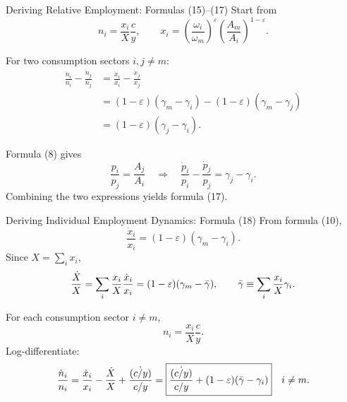 \begin{frame}[label=appendixrelative]{Deriving Relative Employment: Formulas (15)--(17)}
  \scriptsize
  Start from
  \[
    n_i=\frac{x_i}{X}\frac{c}{y},\qquad
    x_i=\left(\frac{\omega_i}{\omega_m}\right)^\varepsilon
      \left(\frac{A_m}{A_i}\right)^{1-\varepsilon}.
  \]

  For two consumption sectors $i,j\neq m$:
  \begin{align*}
    \frac{\dot n_i}{n_i}-\frac{\dot n_j}{n_j}
      &=\frac{\dot x_i}{x_i}-\frac{\dot x_j}{x_j}\\
      &=(1-\varepsilon)(\gamma_m-\gamma_i)
        -(1-\varepsilon)(\gamma_m-\gamma_j)\\
      &=(1-\varepsilon)(\gamma_j-\gamma_i).
  \end{align*}

  Formula (8) gives
  \[
    \frac{p_i}{p_j}
    =
    \frac{A_j}{A_i}
    \quad\Longrightarrow\quad
    \frac{\dot p_i}{p_i}-\frac{\dot p_j}{p_j}
    =
    \gamma_j-\gamma_i .
  \]
  Combining the two expressions yields formula (17).

  \hyperlink{relativeemployment}{}
\end{frame}

\begin{frame}[label=appendixindividual]{Deriving Individual Employment Dynamics: Formula (18)}
  \scriptsize
  From formula (10),
  \[
    \frac{\dot x_i}{x_i}
    =
    (1-\varepsilon)(\gamma_m-\gamma_i).
  \]
  Since $X=\sum_i x_i$,
  \[
    \frac{\dot X}{X}
    =
    \sum_i\frac{x_i}{X}\frac{\dot x_i}{x_i}
    =
    (1-\varepsilon)(\gamma_m-\bar{\gamma}),
    \qquad
    \bar{\gamma}\equiv\sum_i\frac{x_i}{X}\gamma_i .
  \]

  For each consumption sector $i\neq m$,
  \[
    n_i=\frac{x_i}{X}\frac{c}{y}.
  \]
  Log-differentiate:
  \[
    \frac{\dot n_i}{n_i}
    =
    \frac{\dot x_i}{x_i}
    -\frac{\dot X}{X}
    +\frac{\dot{(c/y)}}{c/y}
    =
    \boxed{
    \frac{\dot{(c/y)}}{c/y}
    +(1-\varepsilon)(\bar{\gamma}-\gamma_i)}
    \quad i\neq m .
  \]

  \hyperlink{individualdynamics}{}
\end{frame}

